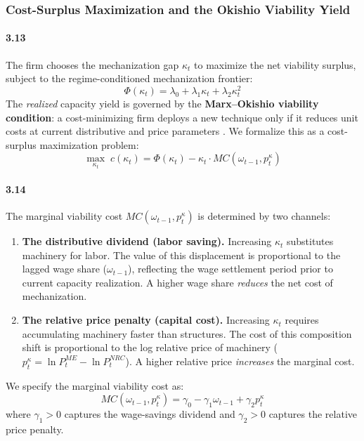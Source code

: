 \subsubsection{Cost-Surplus Maximization and the Okishio
	Viability Yield}

\paragraph{3.13}
The firm chooses the mechanization gap $\kappa_t$ to
maximize the net viability surplus, subject to the
regime-conditioned mechanization frontier:
\begin{equation}
	\Phi(\kappa_t) = \lambda_0 + \lambda_1 \kappa_t
	+ \lambda_2 \kappa_t^2
	\label{eq:32:frontier_kappa}
\end{equation}
The \textit{realized} capacity yield is governed by the
\textbf{Marx--Okishio viability condition}: a
cost-minimizing firm deploys a new technique only if it
reduces unit costs at current distributive and price
parameters \citep{Okishio1961, Basu2022}. We formalize
this as a cost-surplus maximization problem:
\begin{equation}
	\max_{\kappa_t}\; c(\kappa_t)
	= \Phi(\kappa_t) - \kappa_t \cdot MC(\omega_{t-1}, p^\kappa_t)
	\label{eq:32:objective_kappa}
\end{equation}

\paragraph{3.14}
The marginal viability cost $MC(\omega_{t-1}, p^\kappa_t)$
is determined by two channels:
\begin{enumerate}
	\item \textbf{The distributive dividend (labor saving).}
	Increasing $\kappa_t$ substitutes machinery for labor. The
	value of this displacement is proportional to the lagged
	wage share ($\omega_{t-1}$), reflecting the wage
	settlement period prior to current capacity realization.
	A higher wage share \textit{reduces} the net cost of
	mechanization.
	\item \textbf{The relative price penalty (capital cost).}
	Increasing $\kappa_t$ requires accumulating machinery
	faster than structures. The cost of this composition shift
	is proportional to the log relative price of machinery
	($p^\kappa_t = \ln P^{ME}_t - \ln P^{NRC}_t$). A higher
	relative price \textit{increases} the marginal cost.
\end{enumerate}
We specify the marginal viability cost as:
\begin{equation}
	MC(\omega_{t-1}, p^\kappa_t)
	= \gamma_0 - \gamma_1 \omega_{t-1} + \gamma_2 p^\kappa_t
	\label{eq:32:MC}
\end{equation}
where $\gamma_1 > 0$ captures the wage-savings dividend and
$\gamma_2 > 0$ captures the relative price penalty.

